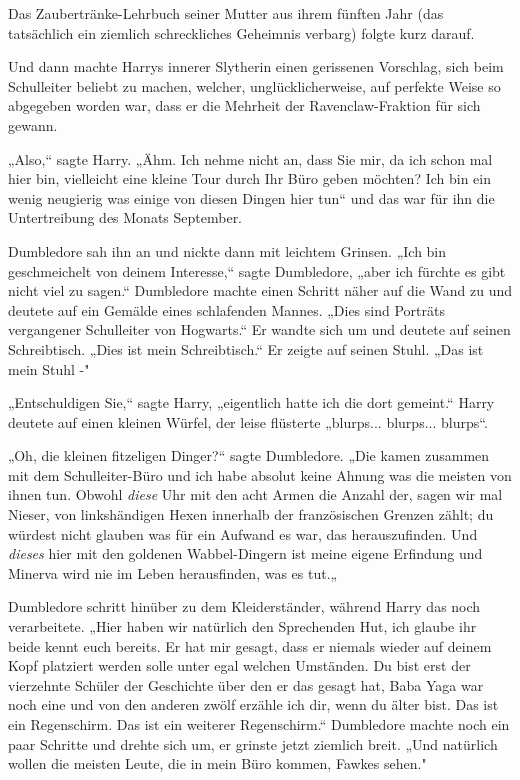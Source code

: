 {Das Zaubertränke-Lehrbuch seiner Mutter aus ihrem fünften Jahr (das tatsächlich ein ziemlich schreckliches Geheimnis verbarg) folgte kurz darauf.

Und dann machte Harrys innerer Slytherin einen gerissenen Vorschlag, sich beim Schulleiter beliebt zu machen, welcher, unglücklicherweise, auf perfekte Weise so abgegeben worden war, dass er die Mehrheit der Ravenclaw-Fraktion für sich gewann.

„Also,“ sagte Harry. „Ähm. Ich nehme nicht an, dass Sie mir, da ich schon mal hier bin, vielleicht eine kleine Tour durch Ihr Büro geben möchten? Ich bin ein wenig neugierig was einige von diesen Dingen hier tun“ und das war für ihn die Untertreibung des Monats September.

Dumbledore sah ihn an und nickte dann mit leichtem Grinsen. „Ich bin geschmeichelt von deinem Interesse,“ sagte Dumbledore, „aber ich fürchte es gibt nicht viel zu sagen.“ Dumbledore machte einen Schritt näher auf die Wand zu und deutete auf ein Gemälde eines schlafenden Mannes. „Dies sind Porträts vergangener Schulleiter von Hogwarts.“ Er wandte sich um und deutete auf seinen Schreibtisch. „Dies ist mein Schreibtisch.“ Er zeigte auf seinen Stuhl. „Das ist mein Stuhl -"

„Entschuldigen Sie,“ sagte Harry, „eigentlich hatte ich die dort gemeint.“ Harry deutete auf einen kleinen Würfel, der leise flüsterte „blurps... blurps... blurps“.

„Oh, die kleinen fitzeligen Dinger?“ sagte Dumbledore. „Die kamen zusammen mit dem Schulleiter-Büro und ich habe absolut keine Ahnung was die meisten von ihnen tun. Obwohl \emph{diese} Uhr mit den acht Armen die Anzahl der, sagen wir mal Nieser, von linkshändigen Hexen innerhalb der französischen Grenzen zählt; du würdest nicht glauben was für ein Aufwand es war, das herauszufinden. Und \emph{dieses} hier mit den goldenen Wabbel-Dingern ist meine eigene Erfindung und Minerva wird nie im Leben herausfinden, was es tut.„

Dumbledore schritt hinüber zu dem Kleiderständer, während Harry das noch verarbeitete. „Hier haben wir natürlich den Sprechenden Hut, ich glaube ihr beide kennt euch bereits. Er hat mir gesagt, dass er niemals wieder auf deinem Kopf platziert werden solle unter egal welchen Umständen. Du bist erst der vierzehnte Schüler der Geschichte über den er das gesagt hat, Baba Yaga war noch eine und von den anderen zwölf erzähle ich dir, wenn du älter bist. Das ist ein Regenschirm. Das ist ein weiterer Regenschirm.“ Dumbledore machte noch ein paar Schritte und drehte sich um, er grinste jetzt ziemlich breit. „Und natürlich wollen die meisten Leute, die in mein Büro kommen, Fawkes sehen."

}
